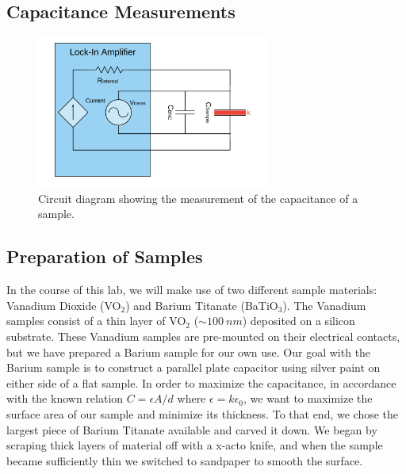\documentclass[%
 reprint,
 amsmath,amssymb,
 aps,
 pra,
]{revtex4-1}
\begin{document}
\subsection{Capacitance Measurements}

\begin{figure}[H]
	\centering
	\includegraphics[height=5cm]{diagram_cap.png}
	\caption{Circuit diagram showing the measurement of the capacitance of a sample.}
	\label{fig:CapMeasurements}
\end{figure}

\subsection{Preparation of Samples}

In the course of this lab, we will make use of two different sample materials: Vanadium Dioxide (VO$_2$) and Barium Titanate (BaTiO$_3$). The Vanadium samples consist of a thin layer of VO$_2$ ($\sim 100~nm$) deposited on a silicon substrate. These Vanadium samples are pre-mounted on their electrical contacts, but we have prepared a Barium sample for our own use. Our goal with the Barium sample is to construct a parallel plate capacitor using silver paint on either side of a flat sample. In order to maximize the capacitance, in accordance with the known relation $C = \epsilon A/d$ where $\epsilon = k \epsilon_0$, we want to maximize the surface area of our sample and minimize its thickness. To that end, we chose the largest piece of Barium Titanate available and carved it down. We began by scraping thick layers of material off with a x-acto knife, and when the sample became sufficiently thin we switched to sandpaper to smooth the surface.
\end{document}
